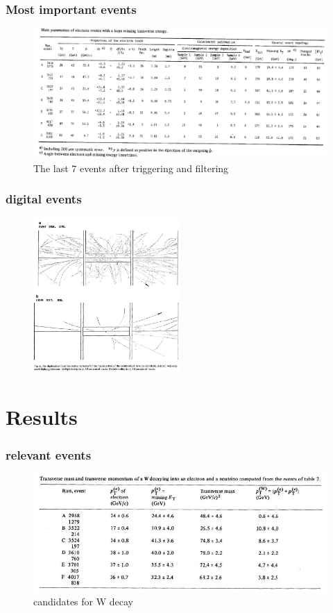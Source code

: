 \documentclass{beamer}
\begin{document}
\begin{frame}
\frametitle{Most important events}
\begin{figure}
  \includegraphics[width=1.0\textwidth]{events}
  \caption{The last 7 events after triggering and filtering}
\end{figure}
\end{frame}

\begin{frame}
\frametitle{digital events}
\begin{figure}
  \includegraphics[width=0.5\textwidth]{digital_event}
\end{figure}
\end{frame}


\section{Results}
\begin{frame}
  \frametitle{relevant events}
  \begin{figure}
    \includegraphics[width=1.0\textwidth]{events2}
    \caption{candidates for W decay}
  \end{figure}
\end{frame}
\end{document}

